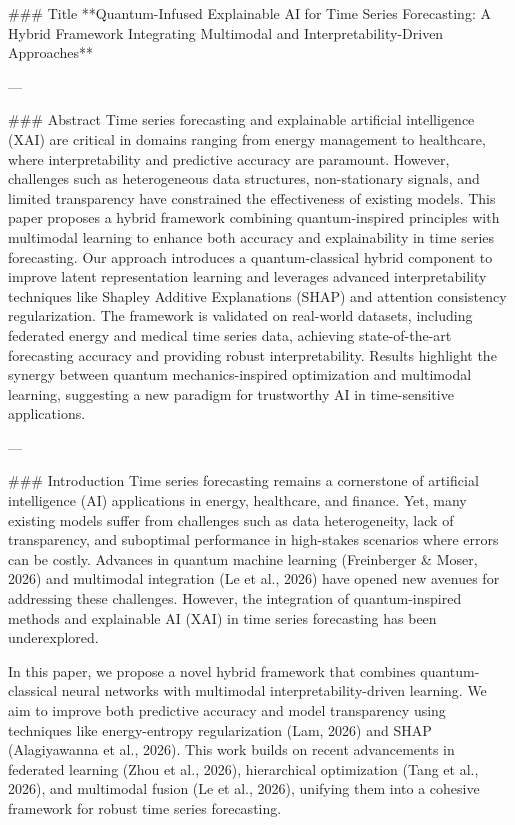### Title
**Quantum-Infused Explainable AI for Time Series Forecasting: A Hybrid Framework Integrating Multimodal and Interpretability-Driven Approaches**

---

### Abstract  
Time series forecasting and explainable artificial intelligence (XAI) are critical in domains ranging from energy management to healthcare, where interpretability and predictive accuracy are paramount. However, challenges such as heterogeneous data structures, non-stationary signals, and limited transparency have constrained the effectiveness of existing models. This paper proposes a hybrid framework combining quantum-inspired principles with multimodal learning to enhance both accuracy and explainability in time series forecasting. Our approach introduces a quantum-classical hybrid component to improve latent representation learning and leverages advanced interpretability techniques like Shapley Additive Explanations (SHAP) and attention consistency regularization. The framework is validated on real-world datasets, including federated energy and medical time series data, achieving state-of-the-art forecasting accuracy and providing robust interpretability. Results highlight the synergy between quantum mechanics-inspired optimization and multimodal learning, suggesting a new paradigm for trustworthy AI in time-sensitive applications.

---

### Introduction  
Time series forecasting remains a cornerstone of artificial intelligence (AI) applications in energy, healthcare, and finance. Yet, many existing models suffer from challenges such as data heterogeneity, lack of transparency, and suboptimal performance in high-stakes scenarios where errors can be costly. Advances in quantum machine learning (Freinberger & Moser, 2026) and multimodal integration (Le et al., 2026) have opened new avenues for addressing these challenges. However, the integration of quantum-inspired methods and explainable AI (XAI) in time series forecasting has been underexplored.

In this paper, we propose a novel hybrid framework that combines quantum-classical neural networks with multimodal interpretability-driven learning. We aim to improve both predictive accuracy and model transparency using techniques like energy-entropy regularization (Lam, 2026) and SHAP (Alagiyawanna et al., 2026). This work builds on recent advancements in federated learning (Zhou et al., 2026), hierarchical optimization (Tang et al., 2026), and multimodal fusion (Le et al., 2026), unifying them into a cohesive framework for robust time series forecasting.


